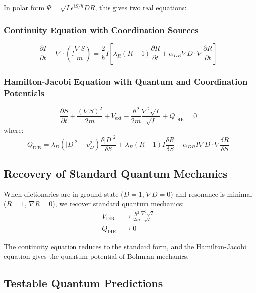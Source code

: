 \documentclass[11pt,a4paper]{article}
\begin{document}
	In polar form $\Psi = \sqrt{I} e^{iS/\hbar} D R$, this gives two real equations:
	
	\subsubsection{Continuity Equation with Coordination Sources}
	\begin{equation}
		\frac{\partial I}{\partial t} + \nabla \cdot \left( I \frac{\nabla S}{m} \right) = \frac{2}{\hbar} I \left[ \lambda_R (R-1) \frac{\partial R}{\partial t} + \alpha_{DR} \nabla D \cdot \nabla \frac{\partial R}{\partial t} \right]
	\end{equation}
	
	\subsubsection{Hamilton-Jacobi Equation with Quantum and Coordination Potentials}
	\begin{equation}
		\frac{\partial S}{\partial t} + \frac{(\nabla S)^2}{2m} + V_{\text{ext}} - \frac{\hbar^2}{2m} \frac{\nabla^2 \sqrt{I}}{\sqrt{I}} + Q_{\text{DIR}} = 0
	\end{equation}
	where:
	\begin{equation}
		Q_{\text{DIR}} = \lambda_D (|D|^2 - v_D^2) \frac{\delta |D|^2}{\delta S} 
		+ \lambda_R (R-1) I \frac{\delta R}{\delta S}
		+ \alpha_{DR} I \nabla D \cdot \nabla \frac{\delta R}{\delta S}
	\end{equation}
	
	\subsection{Recovery of Standard Quantum Mechanics}
	
	When dictionaries are in ground state ($D = 1$, $\nabla D = 0$) and resonance is minimal ($R = 1$, $\nabla R = 0$), we recover standard quantum mechanics:
	\begin{align}
		V_{\text{DIR}} &\to \frac{\hbar^2}{2m} \frac{\nabla^2 \sqrt{I}}{\sqrt{I}} \\
		Q_{\text{DIR}} &\to 0
	\end{align}
	
	The continuity equation reduces to the standard form, and the Hamilton-Jacobi equation gives the quantum potential of Bohmian mechanics.
	
	\subsection{Testable Quantum Predictions}
	
\end{document}
